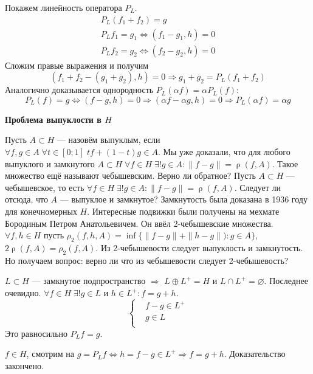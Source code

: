 \documentclass[14pt]{extarticle}
\DeclareMathOperator{\rh}{\rho}
\begin{document}
Покажем линейность оператора $P_L$.
\begin{gather*}
    P_L(f_1 + f_2) = g\\
    P_Lf_1 = g_1 \Leftrightarrow (f_1 - g_1, h) = 0\\
    P_Lf_2 = g_2 \Leftrightarrow (f_2 - g_2, h) = 0
\end{gather*}
Сложим правые выражения и получим
$$
(f_1 + f_2 - (g_1 + g_2), h) = 0 \Rightarrow g_1 + g_2 = P_L(f_1 + f_2)
$$
Аналогично доказывается однородность $P_L(\alpha f) = \alpha P_L(f)$: 
$$
P_L(f) = g \Leftrightarrow (f - g, h) = 0\Rightarrow (\alpha f - \alpha g, h) = 0\Rightarrow P_L(\alpha f) = \alpha g
$$

\textbf{Проблема выпуклости в $H$}

Пусть $A \subset H$ --- назовём выпуклым, если $\forall f,g \in A\;\forall t \in [0;1]\;t f + (1 - t) g \in A$.
Мы уже доказали, что для любого выпуклого и замкнутого $A \subset H\;\forall f \in H\;\exists! g \in A\colon \|f - g\| = \rh(f, A)$.
Такое множество ещё называют чебышевским.
Верно ли обратное? Пусть $A \subset H$ --- чебышевское, то есть $\forall f \in H\;\exists! g \in A\colon \|f - g\| = \rh(f,A)$. 
Следует ли отсюда, что $A$ --- выпуклое и замкнутое?
Замкнутость была доказана в 1936 году для конечномерных $H$.
Интересные подвижки были получены на мехмате Бородиным Петром Анатольевичем.
Он ввёл 2-чебышевские множества.
$\forall f,h \in H$ пусть $\rho_2(f, h, A) = \inf\{\|f - g\| + \|h - g\|):g \in A\}$, $2\rh(f, A) = \rho_2(f, A)$.
Из 2-чебышевости следует выпуклость и замкнутость.
Но получаем вопрос: верно ли что из чебышевости следует 2-чебышевость?

\begin{Theor}
    $L \subset H$ --- замкнутое подпространство $\Rightarrow$ $L \oplus L^+ = H$ и $L \cap L^+ = \varnothing$.
    Последнее очевидно. 
    $\forall f \in H\;\exists! g \in L$ и $h \in L^+\colon f = g + h$.
    $$
    \left\{
        \begin{aligned}
            &f - g \in L^{+}\\
            &g \in L\\
        \end{aligned}
    \right.
    $$
    Это равносильно $P_Lf = g$.
\end{Theor}
\begin{Proof}
$f \in H$, смотрим на $g = P_Lf \Leftrightarrow h = f - g \in L^+\Rightarrow f = g + h$.
Доказательство закончено.
\end{Proof}
\end{document}
